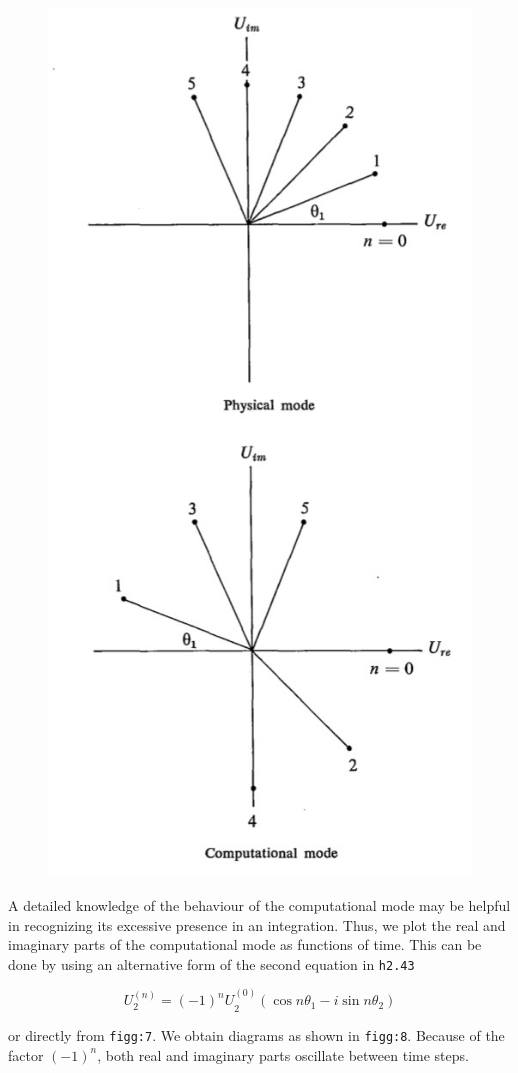 \begin{figure}
    \centering
    \includegraphics[width = .7 \textwidth]{figs/NM/pic7.jpg}
    \caption{} \label{fig:}
\end{figure}

A detailed knowledge of the behaviour of the computational mode may be
helpful in recognizing its excessive presence in an integration. Thus,
we plot the real and imaginary parts of the computational mode as
functions of time. This can be done by using an alternative form of the
second equation in \texttt{h2.43}

\[U_{2}^{\left( n \right)} = {\left( - 1 \right)^{n}U}_{2}^{\left( 0 \right)}\left( \cos{n\theta_{1}} - i\sin{n\theta_{2}} \right)\]

or directly from \texttt{figg:7}. We obtain diagrams as shown in
\texttt{figg:8}. Because of the factor $(-1)^n$, both real and imaginary
parts oscillate between time steps.

